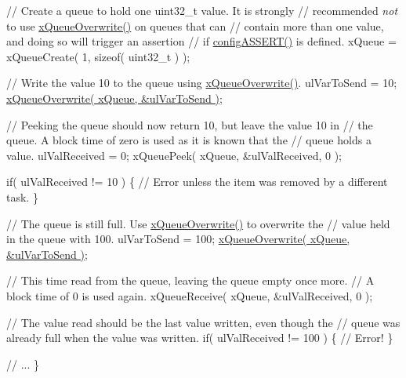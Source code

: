 \begin{DoxyPre}    // Create a queue to hold one uint32\_t value.  It is strongly
    // recommended {\itshape not} to use \hyperlink{queue_8h_a8e9ced123b5a0e37a36d3bbdb2e56b4e}{xQueueOverwrite()} on queues that can
    // contain more than one value, and doing so will trigger an assertion
    // if \hyperlink{_free_r_t_o_s_8h_a228c70cd48927d6ab730ed1a6dfbe35f}{configASSERT()} is defined.
    xQueue = xQueueCreate( 1, sizeof( uint32\_t ) );\end{DoxyPre}



\begin{DoxyPre}    // Write the value 10 to the queue using \hyperlink{queue_8h_a8e9ced123b5a0e37a36d3bbdb2e56b4e}{xQueueOverwrite()}.
    ulVarToSend = 10;
    \hyperlink{queue_8h_a8e9ced123b5a0e37a36d3bbdb2e56b4e}{xQueueOverwrite( xQueue, &ulVarToSend )};\end{DoxyPre}



\begin{DoxyPre}    // Peeking the queue should now return 10, but leave the value 10 in
    // the queue.  A block time of zero is used as it is known that the
    // queue holds a value.
    ulValReceived = 0;
    xQueuePeek( xQueue, &ulValReceived, 0 );\end{DoxyPre}



\begin{DoxyPre}    if( ulValReceived != 10 )
    \{
        // Error unless the item was removed by a different task.
    \}\end{DoxyPre}



\begin{DoxyPre}    // The queue is still full.  Use \hyperlink{queue_8h_a8e9ced123b5a0e37a36d3bbdb2e56b4e}{xQueueOverwrite()} to overwrite the
    // value held in the queue with 100.
    ulVarToSend = 100;
    \hyperlink{queue_8h_a8e9ced123b5a0e37a36d3bbdb2e56b4e}{xQueueOverwrite( xQueue, &ulVarToSend )};\end{DoxyPre}



\begin{DoxyPre}    // This time read from the queue, leaving the queue empty once more.
    // A block time of 0 is used again.
    xQueueReceive( xQueue, &ulValReceived, 0 );\end{DoxyPre}



\begin{DoxyPre}    // The value read should be the last value written, even though the
    // queue was already full when the value was written.
    if( ulValReceived != 100 )
    \{
        // Error!
    \}\end{DoxyPre}



\begin{DoxyPre}    // ...
\}
 \end{DoxyPre}
 